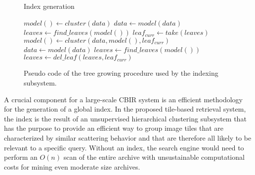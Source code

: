 \label{sec:TSVQ}

\begin{figure*}[t]
		\centering
{\begin{minipage}{0.8\columnwidth}
		\begin{algorithm}[H]
\label{fig:treeGrowingPseudoCode}
		\caption{Index generation}
    \begin{algorithmic}[1]
\State $model() \gets cluster(data)$													
						\State $data \gets model(data)$ 															
            \State $leaves \gets find\_leaves(model())$										
															
								\State $leaf_{curr} \gets take(leaves)$
							      \State $model() \gets cluster(data, model(), leaf_{curr})$
									  \State $data \gets model(data)$
										\State $leaves \gets find\_leaves(model())$
								\Else
										\State $leaves  \gets del\_leaf(leaves, leaf_{curr})$ 
								\EndIf
								
						\EndWhile
        \EndFunction
    \end{algorithmic}

		\end{algorithm}

		\end{minipage}}
		\caption{Pseudo code of the tree growing procedure used by the indexing subsystem.}
\end{figure*}



A crucial component for a large-scale CBIR system is an efficient  methodology for the generation of a global index. 
In the proposed tile-based retrieval system, the index is the result of an unsupervised hierarchical clustering subsystem that has the purpose to provide an efficient way to group image tiles that are characterized by similar scattering behavior and that are therefore all likely to be relevant to a specific query.
Without an index, the search engine would need to perform an $O(n)$ scan of the entire archive with unsustainable computational costs  for mining even moderate size archives.


